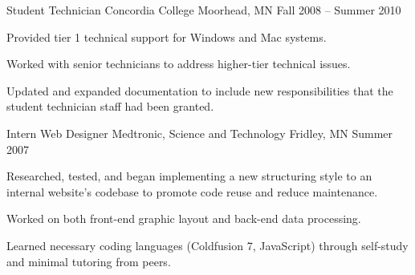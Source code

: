 \cventry
	{Student Technician} %
	{Concordia College} %
	{Moorhead, MN} %
	{Fall 2008 – Summer 2010} %
	{
	  	\begin{cvitems} %
	        \item {Provided tier 1 technical support for Windows and Mac systems.}
			\item {Worked with senior technicians to address higher-tier technical issues.}
			\item {Updated and expanded documentation to include new responsibilities that the student technician staff had been granted.}
		\end{cvitems}
	}

\cventry
	{Intern Web Designer} %
	{Medtronic, Science and Technology} %
	{Fridley, MN} %
	{Summer 2007} %
	{
	  	\begin{cvitems} %
	        \item {Researched, tested, and began implementing a new structuring style to an internal website’s codebase to promote code reuse and reduce maintenance.}
			\item {Worked on both front-end graphic layout and back-end data processing.}
			\item {Learned necessary coding languages (Coldfusion 7, JavaScript) through self-study and minimal tutoring from peers.}
		\end{cvitems}
	}
